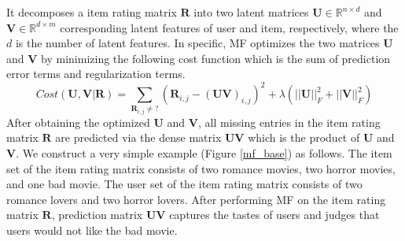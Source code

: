 \documentclass[master,english,final]{kaist-ucs}
\begin{document}
It decomposes a item rating matrix $\bm{R}$ into two latent matrices $\bm{U} \in \mathbb{R}^{n \times d}$ and $\bm{V} \in \mathbb{R}^{d \times m}$ corresponding latent features of user and item, respectively, where the $d$ is the number of latent features.
In specific, MF optimizes the two matrices $\bm{U}$ and $\bm{V}$ by minimizing the following cost function which is the sum of prediction error terms and regularization terms.
\begin{equation}
Cost(\bm{U},\bm{V} | \bm{R})=\sum_{\bm{R}_{i,j} \neq ?} (  \bm{R}_{i,j} - (\bm{UV})_{i,j} )^2 + \lambda(||\bm{U}||_F^2+||\bm{V}||_F^2)
\end{equation}
After obtaining the optimized $\bm{U}$ and $\bm{V}$, all missing entries in the item rating matrix $\bm{R}$ are predicted via the dense matrix $\bm{UV}$ which is the product of $\bm{U}$ and $\bm{V}$.
We construct a very simple example (Figure \ref{mf_base}) as follows.
The item set of the item rating matrix consists of two romance movies, two horror movies, and one bad movie.
The user set of the item rating matrix consists of two romance lovers and two horror lovers.
After performing MF on the item rating matrix $\bm{R}$, prediction matrix $\bm{UV}$ captures the tastes of users and judges that users would not like the bad movie.
\end{document}
